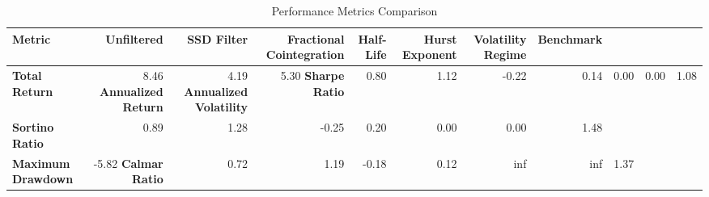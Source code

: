 \begin{table}[ht]
\centering[ht]
\caption{Performance Metrics Comparison}
\label{tab:performance_metrics}
\begin{tabular}{lrrrrrrr}
\toprule
\textbf{Metric}
 & Unfiltered & SSD Filter & Fractional Cointegration & Half-Life & Hurst Exponent & Volatility Regime & Benchmark \\
\midrule
\textbf{Total Return} & 8.46%
\textbf{Annualized Return} & 4.19%
\textbf{Annualized Volatility} & 5.30%
\textbf{Sharpe Ratio} & 0.80 & 1.12 & -0.22 & 0.14 & 0.00 & 0.00 & 1.08 \\
\textbf{Sortino Ratio} & 0.89 & 1.28 & -0.25 & 0.20 & 0.00 & 0.00 & 1.48 \\
\textbf{Maximum Drawdown} & -5.82%
\textbf{Calmar Ratio} & 0.72 & 1.19 & -0.18 & 0.12 & inf & inf & 1.37 \\
\bottomrule
\end{tabular}
\end{table}
